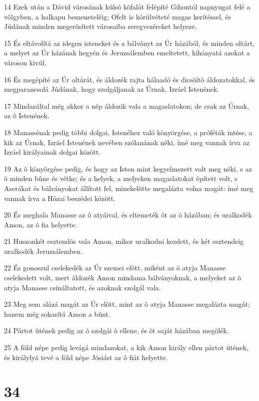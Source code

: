 \par 14 Ezek után a Dávid városának külsõ kõfalát felépíté Gihontól napnyugat felé a völgyben, a halkapu bemeneteléig; Ofelt is körülvéteté magas kerítéssel, és Júdának minden megerõsített városaiba seregvezéreket helyeze.
\par 15 És eltávolítá az idegen isteneket és a bálványt az Úr házából, és minden oltárt, a melyet az Úr házának hegyén és Jeruzsálemben emeltetett, kihányatá azokat a városon  kivül.
\par 16 És megépíté az Úr oltárát, és áldozék rajta hálaadó és dicsõítõ áldozatokkal, és megparancsolá Júdának, hogy szolgáljanak az Úrnak, Izráel Istenének.
\par 17 Mindazáltal még akkor a nép áldozik vala a magaslatokon; de csak az Úrnak, az õ Istenének.
\par 18 Manassénak pedig többi dolgai, Istenéhez való könyörgése, a próféták intése, a kik az Úrnak, Izráel Istenének nevében szólanának néki, ímé meg vannak írva az Izráel királyainak dolgai között.
\par 19 Az õ könyörgése pedig, és hogy az Isten mint kegyelmezett volt meg néki, s az õ minden bûne és vétke; és a helyek, a melyeken magaslatokat épített volt, s Aserákat és bálványokat állított fel, minekelõtte megalázta volna magát: ímé meg vannak írva a Hózai beszédei között.
\par 20 És meghala Manasse az õ atyáival, és eltemeték õt az õ házában; és uralkodék Amon, az õ fia helyette.
\par 21 Huszonkét esztendõs vala Amon, mikor uralkodni kezdett, és két esztendeig uralkodék Jeruzsálemben.
\par 22 És gonoszul cselekedék az Úr szemei elõtt, miként az õ atyja Manasse cselekedett volt, mert áldozék Amon mindama bálványoknak, a melyeket az õ atyja Manasse csináltatott, és azoknak szolgál vala.
\par 23 Meg sem alázá magát az Úr elõtt, mint az õ atyja Manasse megalázta magát; hanem még sokasítá Amon a bûnt.
\par 24 Pártot ütének pedig az õ szolgái õ ellene, és õt saját házában megölék.
\par 25 A föld népe pedig levágá mindazokat, a kik Amon király ellen pártot ütének, és királylyá tevé a föld népe Jósiást az õ fiát helyette.

\chapter{34}

